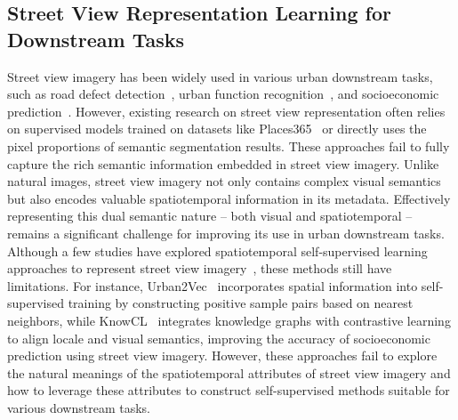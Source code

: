 \subsection{Street View Representation Learning for Downstream Tasks}
Street view imagery has been widely used in various urban downstream tasks, such as road defect detection~\citep{chacra2018municipal}, urban function recognition~\citep{huang2023comprehensive}, and socioeconomic prediction~\citep{fan2023urban}. However, existing research on street view representation often relies on supervised models trained on datasets like Places365~\citep{zhou2017places} or directly uses the pixel proportions of semantic segmentation results. These approaches fail to fully capture the rich semantic information embedded in street view imagery. Unlike natural images, street view imagery not only contains complex visual semantics but also encodes valuable spatiotemporal information in its metadata. Effectively representing this dual semantic nature -- both visual and spatiotemporal -- remains a significant challenge for improving its use in urban downstream tasks. Although a few studies have explored spatiotemporal self-supervised learning approaches to represent street view imagery~\citep{stalder2024selfsupervised}, these methods still have limitations. For instance, Urban2Vec~\citep{wang2020urban2vec} incorporates spatial information into self-supervised training by constructing positive sample pairs based on nearest neighbors, while KnowCL~\citep{liu2023knowledgeinfused} integrates knowledge graphs with contrastive learning to align locale and visual semantics, improving the accuracy of socioeconomic prediction using street view imagery. However, these approaches fail to explore the natural meanings of the spatiotemporal attributes of street view imagery and how to leverage these attributes to construct self-supervised methods suitable for various downstream tasks.